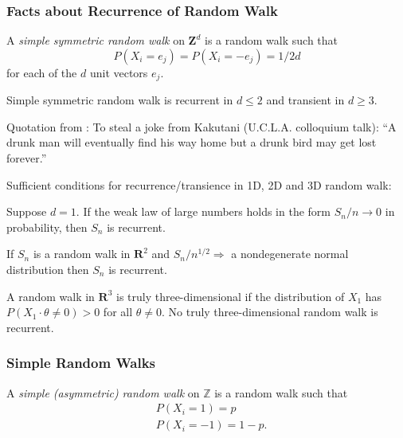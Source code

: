 \subsubsection{Facts about Recurrence of Random Walk}

\begin{definition}
	A \textit{simple symmetric random walk} on $\mathbf{Z}^d$ is a random walk such that
\[
P\left(X_i=e_j\right)=P\left(X_i=-e_j\right)=1 / 2 d
\]
for each of the $d$ unit vectors $e_j$.
\end{definition}

\begin{theorem}
	Simple symmetric random walk is recurrent in $d \leq 2$ and transient in $d \geq 3$.
\end{theorem}
\begin{remark}
	Quotation from \cite{durettProbabilityTheory}:
		To steal a joke from Kakutani (U.C.L.A. colloquium talk): “A drunk man will eventually find his way home but a drunk bird may get lost forever.”
\end{remark}

Sufficient conditions for recurrence/transience in 1D, 2D and 3D random walk:

\begin{theorem}
	Suppose $d=1$. If the weak law of large numbers holds in the form $S_n / n \rightarrow 0$ in probability, then $S_n$ is recurrent.
\end{theorem}

\begin{theorem}
	If $S_n$ is a random walk in $\mathbf{R}^2$ and $S_n / n^{1 / 2} \Rightarrow$ a nondegenerate normal distribution then $S_n$ is recurrent.
\end{theorem}

\begin{theorem}
	A random walk in $\mathbf{R}^3$ is truly three-dimensional if the distribution of $X_1$ has $P\left(X_1 \cdot \theta \neq 0\right)>0$ for all $\theta \neq 0$.
No truly three-dimensional random walk is recurrent.
\end{theorem}

\subsubsection{Simple Random Walks}

\begin{definition}
	A \textit{simple (asymmetric) random walk} on $\mathbb{Z}$ is a random walk such that
	\begin{align*}
		&P(X_i = 1) = p \\
		&P(X_i = -1)= 1-p
	.\end{align*}
	 
\end{definition}

